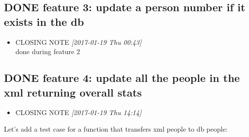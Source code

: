 \documentclass[11pt]{article}
\begin{document}
\subsection{{\bfseries\sffamily DONE} feature 3: update a person number if it exists in the db}
\label{sec:orge5a5f81}
\begin{itemize}
\item CLOSING NOTE \textit{[2017-01-19 Thu 00:43] } \\
done during feature 2
\end{itemize}
\subsection{{\bfseries\sffamily DONE} feature 4: update all the people in the xml returning overall stats}
\label{sec:org94c36fe}
\begin{itemize}
\item CLOSING NOTE \textit{[2017-01-19 Thu 14:14]}
\end{itemize}
Let's add a test case for a function that transfers xml people to db people:
\end{document}
